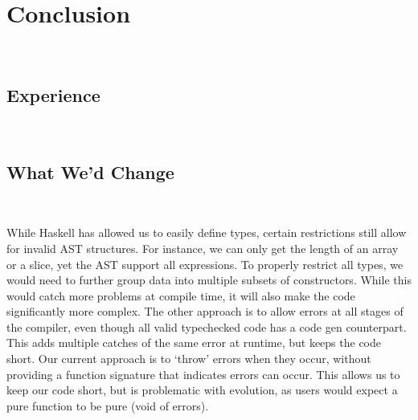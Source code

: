 \documentclass[11pt]{article}
\begin{document}
\section{Conclusion}~%
\subsection{Experience}~%
\subsection{What We'd Change}~%

While Haskell has allowed us to easily define types, certain restrictions still allow for invalid AST structures. 
For instance, we can only get the length of an array or a slice, yet the AST support all expressions.
To properly restrict all types, we would need to further group data into multiple subsets of constructors.
While this would catch more problems at compile time, it will also make the code significantly more complex.
The other approach is to allow errors at all stages of the compiler, 
even though all valid typechecked code has a code gen counterpart.
This adds multiple catches of the same error at runtime, but keeps the code short.
Our current approach is to `throw' errors when they occur, without providing a function signature that indicates errors can occur.
This allows us to keep our code short, but is problematic with evolution, as users would expect a pure function to be pure (void of errors).
\end{document}
